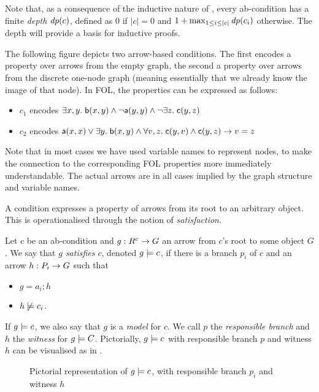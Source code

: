 Note that, as a consequence of the inductive nature of , every ab-condition has a finite \emph{depth} $\mathit{dp}(c)$, defined as $0$ if $|c|=0$ and $1+\max_{1\leq i\leq |c|} \mathit{dp}(c_i)$ otherwise. The depth will provide a basis for inductive proofs.

\begin{example}
The following figure depicts two arrow-based conditions. The first encodes a property over arrows from the empty graph, the second a property over arrows from the discrete one-node graph (meaning essentially that we already know the image of that node). In FOL, the properties can be expressed as follows:
\begin{itemize}
\item $c_1$ encodes $\exists x,y.\; \mathsf{b}(x,y) \wedge \neg \mathsf{a}(y,y)\wedge \neg \exists z.\; \mathsf{c}(y,z)$
\item $c_2$ encodes $\mathsf{a}(x,x)\vee \exists y.\; \mathsf{b}(x,y) \wedge \forall v,z.\; \mathsf{c}(y,v)\wedge \mathsf{c}(y,z) \rightarrow v=z$
\end{itemize}
Note that in most cases we have used variable names to represent nodes, to make the connection to the corresponding FOL properties more immediately understandable. The actual arrows are in all cases implied by the graph structure and variable names.
\begin{center}

\end{center}
\end{example}
%
A condition expresses a property of arrows from its root to an arbitrary object. This is operationalised through the notion of \emph{satisfaction}.

\begin{definition}
  Let $c$ be an ab-condition and $g:R^c\rightarrow G$ an arrow from $c$'s root to some object $G$. We say that \emph{$g$ satisfies $c$}, denoted $g\models c$, if there is a branch $p_i$ of $c$ and an arrow $h:P_i\rightarrow G$ such that
  \begin{itemize}
  \item $g=a_i;h$
  \item $h\not\models c_i$.
  \end{itemize}
\end{definition}
%
If $g\models c$, we also say that $g$ is a \emph{model} for $c$. We call $p$ the \emph{responsible branch} and $h$ the \emph{witness} for $g\models C$. Pictorially, $g\models c$ with responsible branch $p$ and witness $h$ can be visualised as in .
%
\begin{figure}
  \centering
  
  \caption{Pictorial representation of $g\models c$, with responsible branch $p_i$ and witness $h$}
\end{figure}

